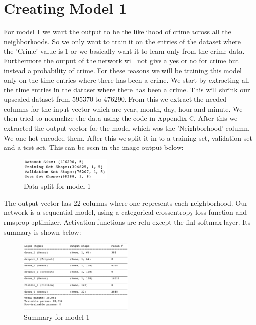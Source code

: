 \documentclass[conference]{IEEEtran}
\begin{document}
    \section{Creating Model 1}

    For model 1 we want the output to be the likelihood of crime across all the neighborhoods. So we only want to train it on the entries of the dataset where the 'Crime' value is 1
    or we basically want it to learn only from the crime data. Furthermore the output of the network will not give a yes or no for crime but instead a probability of crime. For these
    reasons we will be training this model only on the time entries where there has been a crime. We start by extracting all the time entries in the dataset where there has been a crime.
    This will shrink our upscaled dataset from 595370 to 476290. From this we extract the needed columns for the input vector which are year, month, day, hour and minute.
    We then tried to normalize the data using the code in Appendix C. After this we extracted the output vector for the model which was the 'Neighborhood' column. We one-hot encoded them. After this
    we split it in to a training set, validation set and a test set. This can be seen in the image output below:

    \begin{figure}[H]
        \centering
        \captionsetup{justification=centering}
        \centering
            \includegraphics[width=0.4\textwidth]{one1.png}
            \caption{Data split for model 1}
    \end{figure}

    The output vector has 22 columns where one represents each neighborhood. Our network is a sequential model, using a categorical crossentropy loss function and rmsprop optimizer. Activation functions are relu except the finl softmax layer. Its summary is shown below:

    \begin{figure}[H]
        \centering
        \captionsetup{justification=centering}
        \centering
            \includegraphics[width=00.5\textwidth]{m1.png}
            \caption{Summary for model 1}
    \end{figure}
\end{document}
